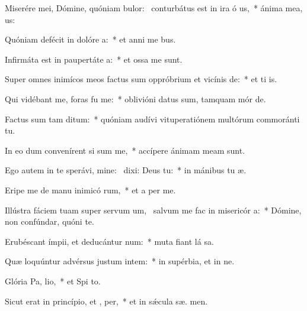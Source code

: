 \item Miserére mei, Dómine, quóniam bulor:~\pscross{} conturbátus est in ira ó us,~* ánima mea,   us:
\item Quóniam defécit in dolóre  a:~* et anni me  bus.
\item Infirmáta est in paupertáte  a:~* et ossa me  sunt.
\item Super omnes inimícos meos factus sum oppróbrium et vicínis  de:~* et ti  is.
\item Qui vidébant me, foras fu  me:~* oblivióni datus sum, tamquam mór  de.
\item Factus sum tam  ditum:~* quóniam audívi vituperatiónem multórum commoránti  tu.
\item In eo dum convenírent si sum me,~* accípere ánimam meam  sunt.
\item Ego autem in te sperávi, mine:~\pscross{} dixi: Deus   tu:~* in mánibus tu  æ.
\item Eripe me de manu inimicó rum,~* et a per me.
\item Illústra fáciem tuam super servum um,~\pscross{} salvum me fac in misericór a:~* Dómine, non confúndar, quóni  te.
\item Erubéscant ímpii, et deducántur  num:~* muta fiant lá sa.
\item Quæ loquúntur advérsus justum intem:~* in supérbia, et in ne.
\item Glória Pa,  lio,~* et Spi to.
\item Sicut erat in princípio, et ,  per,~* et in sǽcula sæ. men.
